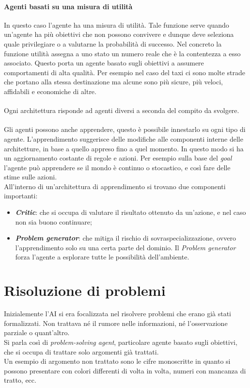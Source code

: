 \documentclass[10pt,a4paper]{book}
\begin{document}
\subsubsection{Agenti basati su una misura di utilit\`a}
In questo caso l'agente ha una misura di utilit\`a. Tale funzione serve quando un'agente ha pi\`u obiettivi che non possono convivere e dunque deve seleziona quale privilegiare o a valutarne la probabilit\`a di successo. Nel concreto la funzione utilit\`a  assegna a uno stato un numero reale che \`e la contentezza a esso associato.
Questo porta un agente basato sugli obiettivi a assumere comportamenti di alta qualit\`a. Per esempio nel caso del taxi ci sono molte strade che portano alla stessa destinazione ma alcune sono pi\`u sicure, pi\`u veloci, affidabili e economiche di altre.
\\\\
\noindent
Ogni architettura risponde ad agenti diversi a seconda del compito da svolgere.
\\\\
Gli agenti possono anche apprendere, questo \`e possibile innestarlo su ogni tipo di agente. L'apprendimento suggerisce delle modifiche alle componenti interne delle architetture, in base a quello appreso fino a quel momento. In questo modo si ha un aggiornamento costante di regole e azioni. Per esempio sulla base del \textit{goal} l'agente pu\`o apprendere se il mondo \`e continuo o stocastico, e cos\`i fare delle stime sulle azioni.\\
All'interno di un'architettura di apprendimento si trovano due componenti importanti:
\begin{itemize}
\item \textbf{\textit{Critic}}: che si occupa di valutare il risultato ottenuto da un'azione, e nel caso non sia buono continuare;
\item \textbf{\textit{Problem generator}}: che mitiga il rischio di sovraspecializzazione, ovvero l'apprendimento solo su una certa parte del dominio. Il \textit{Problem generator} forza l'agente a esplorare tutte le possibilit\`a dell'ambiente.
\end{itemize}
\newpage
\chapter{Risoluzione di problemi}
Inizialemente l'AI si era focalizzata nel risolvere problemi che erano gi\`a stati formalizzati. Non trattava n\'e il rumore nelle informazioni, n\'e l'osservazione parziale o quant'altro.\\
Si parla cos\`i di \textit{problem-solving agent}, particolare agente basato sugli obiettivi, che si occupa di trattare solo argomenti gi\`a trattati.\\
Un esempio di argomento non trattato sono le cifre monoscritte in quanto si possono presentare con colori differenti di volta in volta, numeri con mancanza di tratto, ecc.\\
\end{document}
